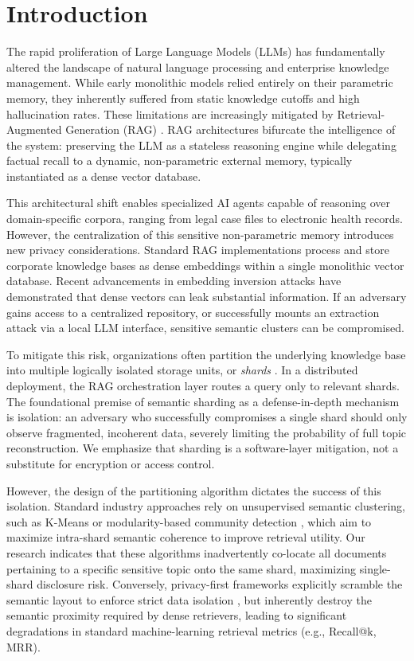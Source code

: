 \section{Introduction}
\label{sec:intro}

The rapid proliferation of Large Language Models (LLMs) has fundamentally altered the landscape of natural language processing and enterprise knowledge management. While early monolithic models relied entirely on their parametric memory, they inherently suffered from static knowledge cutoffs and high hallucination rates. These limitations are increasingly mitigated by Retrieval-Augmented Generation (RAG) \cite{lewis2020rag}. RAG architectures bifurcate the intelligence of the system: preserving the LLM as a stateless reasoning engine while delegating factual recall to a dynamic, non-parametric external memory, typically instantiated as a dense vector database.

This architectural shift enables specialized AI agents capable of reasoning over domain-specific corpora, ranging from legal case files to electronic health records. However, the centralization of this sensitive non-parametric memory introduces new privacy considerations. Standard RAG implementations process and store corporate knowledge bases as dense embeddings within a single monolithic vector database. Recent advancements in embedding inversion attacks \cite{carlini2021extract, morris2023vec2text} have demonstrated that dense vectors can leak substantial information. If an adversary gains access to a centralized repository, or successfully mounts an extraction attack via a local LLM interface, sensitive semantic clusters can be compromised.

To mitigate this risk, organizations often partition the underlying knowledge base into multiple logically isolated storage units, or \textit{shards} \cite{wang2024mrag}. In a distributed deployment, the RAG orchestration layer routes a query only to relevant shards. The foundational premise of semantic sharding as a defense-in-depth mechanism is isolation: an adversary who successfully compromises a single shard should only observe fragmented, incoherent data, severely limiting the probability of full topic reconstruction. We emphasize that sharding is a software-layer mitigation, not a substitute for encryption or access control.

However, the design of the partitioning algorithm dictates the success of this isolation. Standard industry approaches rely on unsupervised semantic clustering, such as K-Means or modularity-based community detection \cite{ng2001spectral}, which aim to maximize intra-shard semantic coherence to improve retrieval utility. Our research indicates that these algorithms inadvertently co-locate all documents pertaining to a specific sensitive topic onto the same shard, maximizing single-shard disclosure risk. Conversely, privacy-first frameworks explicitly scramble the semantic layout to enforce strict data isolation \cite{yang2025splitrag}, but inherently destroy the semantic proximity required by dense retrievers, leading to significant degradations in standard machine-learning retrieval metrics (e.g., Recall@k, MRR). 

